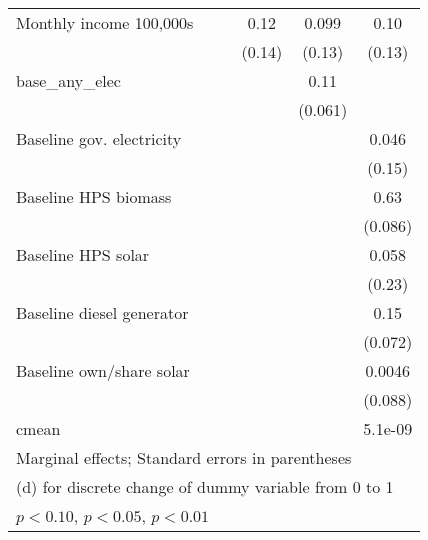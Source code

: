 \begin{table}[htbp]
\begin{tabular*}{1\hsize}{@{\hskip\tabcolsep\extracolsep\fill}l*{5}{c}}
Monthly income 100,000s&                  &                  &     0.12         &    0.099         &     0.10         \\
                &                  &                  &   (0.14)         &   (0.13)         &   (0.13)         \\
base\_any\_elec   &                  &                  &                  &     0.11\sym{*}  &                  \\
                &                  &                  &                  &  (0.061)         &                  \\
Baseline gov. electricity&                  &                  &                  &                  &    0.046         \\
                &                  &                  &                  &                  &   (0.15)         \\
Baseline HPS biomass&                  &                  &                  &                  &     0.63\sym{***}\\
                &                  &                  &                  &                  &  (0.086)         \\
Baseline HPS solar&                  &                  &                  &                  &    0.058         \\
                &                  &                  &                  &                  &   (0.23)         \\
Baseline diesel generator&                  &                  &                  &                  &     0.15\sym{**} \\
                &                  &                  &                  &                  &  (0.072)         \\
Baseline own/share solar&                  &                  &                  &                  &   0.0046         \\
                &                  &                  &                  &                  &  (0.088)         \\
\midrule
cmean           &                  &                  &                  &                  &  5.1e-09         \\
\bottomrule
\multicolumn{6}{l}{\footnotesize Marginal effects; Standard errors in parentheses}\\
\multicolumn{6}{l}{\footnotesize  (d) for discrete change of dummy variable from 0 to 1}\\
\multicolumn{6}{l}{\footnotesize \sym{*} \(p<0.10\), \sym{**} \(p<0.05\), \sym{***} \(p<0.01\)}\\
\end{tabular*}
\end{table}
